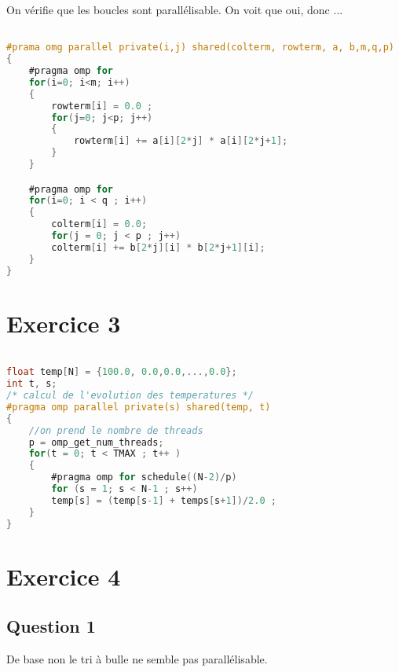 \documentclass[10pt,a4paper]{article}
\begin{document}
On vérifie que les boucles sont parallélisable. On voit que oui, donc ...

\begin{lstlisting}[language=C]

#prama omg parallel private(i,j) shared(colterm, rowterm, a, b,m,q,p)
{
    #pragma omp for
    for(i=0; i<m; i++)
    {
        rowterm[i] = 0.0 ;
        for(j=0; j<p; j++)
        {
            rowterm[i] += a[i][2*j] * a[i][2*j+1];
        }
    }

    #pragma omp for
    for(i=0; i < q ; i++)
    {
        colterm[i] = 0.0;
        for(j = 0; j < p ; j++)
        colterm[i] += b[2*j][i] * b[2*j+1][i];
    }
}

\end{lstlisting}

\section*{Exercice 3}

\begin{lstlisting}[language=C]

float temp[N] = {100.0, 0.0,0.0,...,0.0};
int t, s;
/* calcul de l'evolution des temperatures */
#pragma omp parallel private(s) shared(temp, t)
{
    //on prend le nombre de threads
    p = omp_get_num_threads;
    for(t = 0; t < TMAX ; t++ )
    {
        #pragma omp for schedule((N-2)/p)
        for (s = 1; s < N-1 ; s++)
        temp[s] = (temp[s-1] + temps[s+1])/2.0 ;
    }
}

\end{lstlisting}

\section*{Exercice 4}
\subsection*{Question 1}
De base non le tri à bulle ne semble pas parallélisable.
\end{document}
